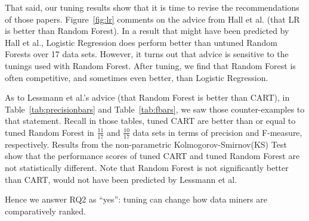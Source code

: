 \documentclass{sig-alternative}
\newcommand{\fig}[1]{Figure~\ref{fig:#1}}
\newcommand{\tab}[1]{Table~\ref{tab:#1}}
\begin{document}
That said, our tuning results show that it is time to revise
the recommendations of those papers. 
  \fig{lr} comments on the advice from Hall et al. (that LR is better than Random Forest).
 In a result that might have been predicted by Hall et al., Logistic Regression does perform better than untuned Random
Forests over 17 data sets. 
However, it turns out that advice is sensitive to the tunings
used with Random Forest. After tuning, we find that Random Forest
is often competitive, and sometimes even better, than Logistic Regression. 


As to Lessmann et al.'s advice (that Random Forest is better than 
CART),  
in \tab{precisionbars} and \tab{fbars}, we saw those counter-examples
to that statement.
Recall in those tables,
tuned CART are better than or equal
to tuned Random Forest in $\frac{11}{17}$ and $\frac{10}{17}$ data sets in
terms of precision and F-measure, respectively. Results from the non-parametric
Kolmogorov-Smirnov(KS) Test show that the performance 
scores of tuned CART and tuned Random Forest are not statistically different.
Note that Random Forest is  not significantly better than CART, would not have been
predicted by   Lessmann et al.
  

Hence we answer RQ2 as ``yes'': tuning can change how  data miners are comparatively ranked.
 


\end{document}
